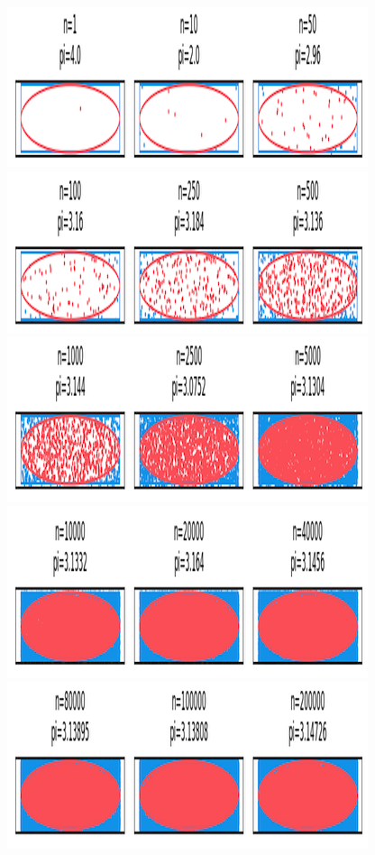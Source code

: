 \documentclass[UTF8, letter]{article}
\begin{document}
\centering
\includegraphics[width=\textwidth]{output-1-1.png}
\includegraphics[width=\textwidth]{output-1-2.png}
\includegraphics[width=\textwidth]{output-1-3.png}
\includegraphics[width=\textwidth]{output-1-4.png}
\includegraphics[width=\textwidth]{output-1-5.png}
\end{document}
